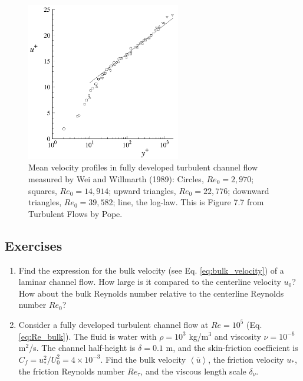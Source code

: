 \documentclass[12pt]{article}
\numberwithin{equation}{section}
\numberwithin{figure}{section}
\numberwithin{table}{section}
\begin{document}
\begin{figure}[h]
  \centering
  \includegraphics[width=0.6\textwidth]{assets/fig_law_of_the_wall_measurements.png}
  \caption{
    Mean velocity profiles in fully developed turbulent channel flow measured by
    Wei and Willmarth (1989):
    Circles, $Re_0 = 2,970$; squares, $Re_0 = 14,914$; upward triangles, $Re_0 = 22,776$;
    downward triangles, $Re_0 = 39,582$; line, the log-law.
    This is Figure 7.7 from Turbulent Flows by Pope.
  }
  \label{fig:law_of_the_wall_measurements}
\end{figure}


\subsection*{Exercises}

\begin{enumerate}
  \item Find the expression for the bulk velocity (see Eq. \ref{eq:bulk_velocity})
  of a laminar channel flow. How large is it compared to the centerline velocity
  $u_0$? How about the bulk Reynolds number relative to the centerline Reynolds
  number $Re_0$?
  \item Consider a fully developed turbulent channel flow at $Re = 10^5$ (Eq. \ref{eq:Re_bulk}).
  The fluid is water with $\rho = 10^3$ kg/m$^3$ and viscosity $\nu = 10^{-6}$ m$^2$/s.
  The channel half-height is $\delta = 0.1$ m,
  and the skin-friction coefficient is $C_f = u_*^2 / U_0^2 = 4 \times 10^{-3}$.
  Find the bulk velocity $\left< \overline{u} \right>$, the friction velocity $u_*$,
  the friction Reynolds number $Re_\tau$, and the viscous length scale $\delta_\nu$.
\end{enumerate}
\end{document}
